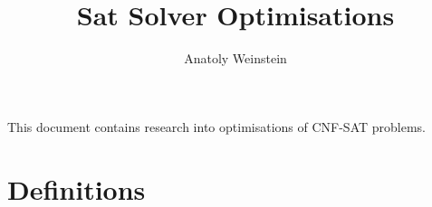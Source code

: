 \documentclass[12pt, letterpaper]{article}
\title{Sat Solver Optimisations}
\author{Anatoly Weinstein}
\begin{document}
    \maketitle

    This document contains research into optimisations of CNF-SAT problems.


    \section{Definitions}
\end{document}
